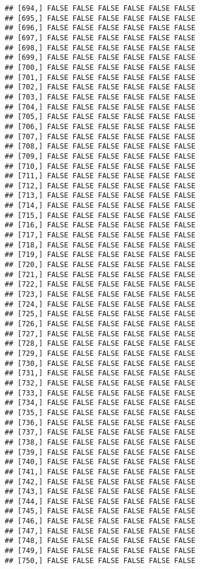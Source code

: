 \documentclass[
]{article}
\begin{document}
\begin{verbatim}
## [694,] FALSE FALSE FALSE FALSE FALSE FALSE
## [695,] FALSE FALSE FALSE FALSE FALSE FALSE
## [696,] FALSE FALSE FALSE FALSE FALSE FALSE
## [697,] FALSE FALSE FALSE FALSE FALSE FALSE
## [698,] FALSE FALSE FALSE FALSE FALSE FALSE
## [699,] FALSE FALSE FALSE FALSE FALSE FALSE
## [700,] FALSE FALSE FALSE FALSE FALSE FALSE
## [701,] FALSE FALSE FALSE FALSE FALSE FALSE
## [702,] FALSE FALSE FALSE FALSE FALSE FALSE
## [703,] FALSE FALSE FALSE FALSE FALSE FALSE
## [704,] FALSE FALSE FALSE FALSE FALSE FALSE
## [705,] FALSE FALSE FALSE FALSE FALSE FALSE
## [706,] FALSE FALSE FALSE FALSE FALSE FALSE
## [707,] FALSE FALSE FALSE FALSE FALSE FALSE
## [708,] FALSE FALSE FALSE FALSE FALSE FALSE
## [709,] FALSE FALSE FALSE FALSE FALSE FALSE
## [710,] FALSE FALSE FALSE FALSE FALSE FALSE
## [711,] FALSE FALSE FALSE FALSE FALSE FALSE
## [712,] FALSE FALSE FALSE FALSE FALSE FALSE
## [713,] FALSE FALSE FALSE FALSE FALSE FALSE
## [714,] FALSE FALSE FALSE FALSE FALSE FALSE
## [715,] FALSE FALSE FALSE FALSE FALSE FALSE
## [716,] FALSE FALSE FALSE FALSE FALSE FALSE
## [717,] FALSE FALSE FALSE FALSE FALSE FALSE
## [718,] FALSE FALSE FALSE FALSE FALSE FALSE
## [719,] FALSE FALSE FALSE FALSE FALSE FALSE
## [720,] FALSE FALSE FALSE FALSE FALSE FALSE
## [721,] FALSE FALSE FALSE FALSE FALSE FALSE
## [722,] FALSE FALSE FALSE FALSE FALSE FALSE
## [723,] FALSE FALSE FALSE FALSE FALSE FALSE
## [724,] FALSE FALSE FALSE FALSE FALSE FALSE
## [725,] FALSE FALSE FALSE FALSE FALSE FALSE
## [726,] FALSE FALSE FALSE FALSE FALSE FALSE
## [727,] FALSE FALSE FALSE FALSE FALSE FALSE
## [728,] FALSE FALSE FALSE FALSE FALSE FALSE
## [729,] FALSE FALSE FALSE FALSE FALSE FALSE
## [730,] FALSE FALSE FALSE FALSE FALSE FALSE
## [731,] FALSE FALSE FALSE FALSE FALSE FALSE
## [732,] FALSE FALSE FALSE FALSE FALSE FALSE
## [733,] FALSE FALSE FALSE FALSE FALSE FALSE
## [734,] FALSE FALSE FALSE FALSE FALSE FALSE
## [735,] FALSE FALSE FALSE FALSE FALSE FALSE
## [736,] FALSE FALSE FALSE FALSE FALSE FALSE
## [737,] FALSE FALSE FALSE FALSE FALSE FALSE
## [738,] FALSE FALSE FALSE FALSE FALSE FALSE
## [739,] FALSE FALSE FALSE FALSE FALSE FALSE
## [740,] FALSE FALSE FALSE FALSE FALSE FALSE
## [741,] FALSE FALSE FALSE FALSE FALSE FALSE
## [742,] FALSE FALSE FALSE FALSE FALSE FALSE
## [743,] FALSE FALSE FALSE FALSE FALSE FALSE
## [744,] FALSE FALSE FALSE FALSE FALSE FALSE
## [745,] FALSE FALSE FALSE FALSE FALSE FALSE
## [746,] FALSE FALSE FALSE FALSE FALSE FALSE
## [747,] FALSE FALSE FALSE FALSE FALSE FALSE
## [748,] FALSE FALSE FALSE FALSE FALSE FALSE
## [749,] FALSE FALSE FALSE FALSE FALSE FALSE
## [750,] FALSE FALSE FALSE FALSE FALSE FALSE

\end{verbatim}
\end{document}
